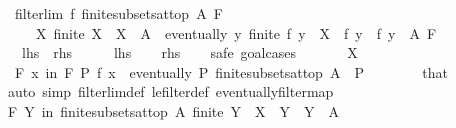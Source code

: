 \begin{isabellebody}
\ \ {\isachardoublequoteopen}filterlim\ f\ {\isacharparenleft}{\kern0pt}finite{\isacharunderscore}{\kern0pt}subsets{\isacharunderscore}{\kern0pt}at{\isacharunderscore}{\kern0pt}top\ A{\isacharparenright}{\kern0pt}\ F\ {\isasymlongleftrightarrow}\isanewline
\ \ \ \ \ {\isacharparenleft}{\kern0pt}{\isasymforall}X{\isachardot}{\kern0pt}\ finite\ X\ {\isasymand}\ X\ {\isasymsubseteq}\ A\ {\isasymlongrightarrow}\ eventually\ {\isacharparenleft}{\kern0pt}{\isasymlambda}y{\isachardot}{\kern0pt}\ finite\ {\isacharparenleft}{\kern0pt}f\ y{\isacharparenright}{\kern0pt}\ {\isasymand}\ X\ {\isasymsubseteq}\ f\ y\ {\isasymand}\ f\ y\ {\isasymsubseteq}\ A{\isacharparenright}{\kern0pt}\ F{\isacharparenright}{\kern0pt}{\isachardoublequoteclose}\isanewline
\ \ {\isacharparenleft}{\kern0pt}\ {\isachardoublequoteopen}{\isacharquery}{\kern0pt}lhs\ {\isacharequal}{\kern0pt}\ {\isacharquery}{\kern0pt}rhs{\isachardoublequoteclose}{\isacharparenright}{\kern0pt}\isanewline
%
\isadelimproof
%
\endisadelimproof
%
\isatagproof
{}\isamarkupfalse%
\ \isanewline
\ \ \isamarkupfalse%
\ {\isacharquery}{\kern0pt}lhs\isanewline
\ \ \isamarkupfalse%
\ {\isacharquery}{\kern0pt}rhs\isanewline
\ \ \isamarkupfalse%
\ {\isacharparenleft}{\kern0pt}safe{\isacharcomma}{\kern0pt}\ goal{\isacharunderscore}{\kern0pt}cases{\isacharparenright}{\kern0pt}\isanewline
\ \ \ \ \isamarkupfalse%
\ {\isacharparenleft}{\kern0pt}{}\ X{\isacharparenright}{\kern0pt}\isanewline
\ \ \ \ \isamarkupfalse%
\ {\isacharasterisk}{\kern0pt}{\isacharcolon}{\kern0pt}\ {\isachardoublequoteopen}{\isacharparenleft}{\kern0pt}{\isasymforall}\isactrlsub F\ x\ in\ F{\isachardot}{\kern0pt}\ P\ {\isacharparenleft}{\kern0pt}f\ x{\isacharparenright}{\kern0pt}{\isacharparenright}{\kern0pt}{\isachardoublequoteclose}\ \ {\isachardoublequoteopen}eventually\ P\ {\isacharparenleft}{\kern0pt}finite{\isacharunderscore}{\kern0pt}subsets{\isacharunderscore}{\kern0pt}at{\isacharunderscore}{\kern0pt}top\ A{\isacharparenright}{\kern0pt}{\isachardoublequoteclose}\ \ P\isanewline
\ \ \ \ \ \ \isamarkupfalse%
\ that\ \isamarkupfalse%
\ {\isacharparenleft}{\kern0pt}auto\ simp{\isacharcolon}{\kern0pt}\ filterlim{\isacharunderscore}{\kern0pt}def\ le{\isacharunderscore}{\kern0pt}filter{\isacharunderscore}{\kern0pt}def\ eventually{\isacharunderscore}{\kern0pt}filtermap{\isacharparenright}{\kern0pt}\isanewline
\ \ \ \ \isamarkupfalse%
\ {\isachardoublequoteopen}{\isasymforall}\isactrlsub F\ Y\ in\ finite{\isacharunderscore}{\kern0pt}subsets{\isacharunderscore}{\kern0pt}at{\isacharunderscore}{\kern0pt}top\ A{\isachardot}{\kern0pt}\ finite\ Y\ {\isasymand}\ X\ {\isasymsubseteq}\ Y\ {\isasymand}\ Y\ {\isasymsubseteq}\ A{\isachardoublequoteclose}\isanewline

\end{isabellebody}
